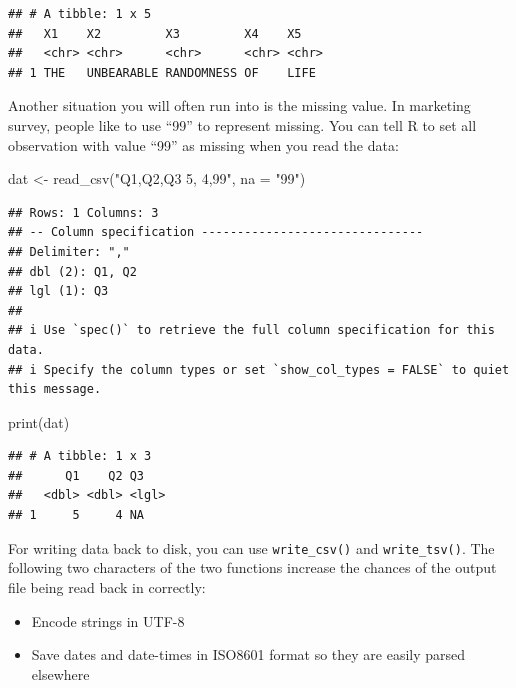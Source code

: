 \documentclass[
  12pt,
]{krantz}
\makeatletter
\newenvironment{Shaded}{\begin{snugshade}}{\end{snugshade}}
\newcommand{\AttributeTok}[1]{\textcolor[rgb]{0.61,0.61,0.61}{#1}}
\newcommand{\FunctionTok}[1]{\textcolor[rgb]{0,0,0}{#1}}
\newcommand{\NormalTok}[1]{#1}
\newcommand{\OtherTok}[1]{\textcolor[rgb]{0.37,0.37,0.37}{#1}}
\newcommand{\StringTok}[1]{\textcolor[rgb]{0.5,0.5,0.5}{#1}}
\providecommand{\tightlist}{%
  \setlength{\itemsep}{0pt}\setlength{\parskip}{0pt}}
\newenvironment{kframe}{%
\medskip{}
\setlength{\fboxsep}{.8em}
 \def\at@end@of@kframe{}%
 \ifinner\ifhmode%
  \def\at@end@of@kframe{\end{minipage}}%
  \begin{minipage}{\columnwidth}%
 \fi\fi%
 \def\FrameCommand##1{\hskip\@totalleftmargin \hskip-\fboxsep
 \colorbox{shadecolor}{##1}\hskip-\fboxsep
     \hskip-\linewidth \hskip-\@totalleftmargin \hskip\columnwidth}%
 \MakeFramed {\advance\hsize-\width
   \@totalleftmargin\z@ \linewidth\hsize
   \@setminipage}}%
 {\par\unskip\endMakeFramed%
 \at@end@of@kframe}
\renewenvironment{Shaded}{\begin{kframe}}{\end{kframe}}
\makeatother
\begin{document}
\begin{verbatim}
## # A tibble: 1 x 5
##   X1    X2         X3         X4    X5   
##   <chr> <chr>      <chr>      <chr> <chr>
## 1 THE   UNBEARABLE RANDOMNESS OF    LIFE
\end{verbatim}

Another situation you will often run into is the missing value. In marketing survey, people like to use ``99'' to represent missing. You can tell R to set all observation with value ``99'' as missing when you read the data:

\begin{Shaded}
\begin{Highlighting}[]
\NormalTok{dat }\OtherTok{\textless{}{-}} \FunctionTok{read\_csv}\NormalTok{(}\StringTok{"Q1,Q2,Q3}
\StringTok{               5, 4,99"}\NormalTok{, }
               \AttributeTok{na =} \StringTok{"99"}\NormalTok{)}
\end{Highlighting}
\end{Shaded}

\begin{verbatim}
## Rows: 1 Columns: 3
## -- Column specification -------------------------------
## Delimiter: ","
## dbl (2): Q1, Q2
## lgl (1): Q3
## 
## i Use `spec()` to retrieve the full column specification for this data.
## i Specify the column types or set `show_col_types = FALSE` to quiet this message.
\end{verbatim}

\begin{Shaded}
\begin{Highlighting}[]
\FunctionTok{print}\NormalTok{(dat)}
\end{Highlighting}
\end{Shaded}

\begin{verbatim}
## # A tibble: 1 x 3
##      Q1    Q2 Q3   
##   <dbl> <dbl> <lgl>
## 1     5     4 NA
\end{verbatim}

For writing data back to disk, you can use \texttt{write\_csv()} and \texttt{write\_tsv()}. The following two characters of the two functions increase the chances of the output file being read back in correctly:

\begin{itemize}
\tightlist
\item
  Encode strings in UTF-8
\item
  Save dates and date-times in ISO8601 format so they are easily parsed elsewhere
\end{itemize}
\end{document}
